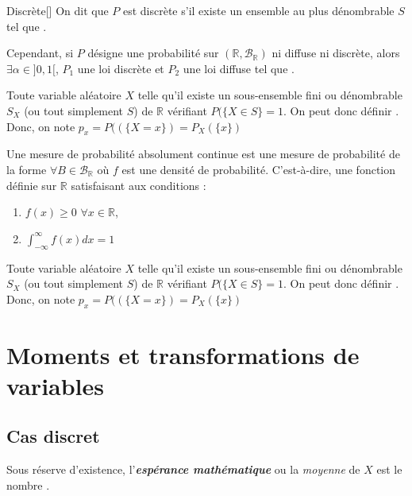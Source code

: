 \documentclass[10pt, french]{report}
\begin{document}
\begin{multicols*}{2}
\begin{definitionGENERAL}{Discrète}[]
On dit que $P$ est discrète s'il existe un ensemble au plus dénombrable $S$ tel que .
\end{definitionGENERAL}

Cependant, si $P$ désigne une probabilité sur $(\mathbb{R}, \mathcal{B}_{\mathbb{R}})$ ni diffuse ni discrète, alors $\exists \alpha \in ]0, 1[$, $P_{1}$ une loi discrète et $P_{2}$ une loi diffuse tel que .

\bigskip

\begin{definitionNOHFILL}
Toute variable aléatoire $X$ telle qu'il existe un sous-ensemble fini ou dénombrable $S_{X}$ (ou tout simplement $S$) de $\mathbb{R}$ vérifiant $P(\{X \in S\} = 1$. On peut donc définir . Donc, on note $p_{x} = P((\{X = x\}) = P_{X}(\{x\})$
\end{definitionNOHFILL}

\begin{definitionNOHFILL}
Une mesure de probabilité absolument continue est une mesure de probabilité de la forme  $\forall B \in \mathcal{B}_{\mathbb{R}}$ où $f$ est une densité de probabilité. C'est-à-dire, une fonction définie sur $\mathbb{R}$ satisfaisant aux conditions : 
\begin{enumerate}[label = \circled{\arabic*}{trueblue}]
	\item	$f(x) \geq 0$ $\forall x \in \mathbb{R}$,
	\item	$\int_{-\infty}^{\infty} f(x)dx = 1$
\end{enumerate}

Toute variable aléatoire $X$ telle qu'il existe un sous-ensemble fini ou dénombrable $S_{X}$ (ou tout simplement $S$) de $\mathbb{R}$ vérifiant $P(\{X \in S\} = 1$. On peut donc définir . Donc, on note $p_{x} = P((\{X = x\}) = P_{X}(\{x\})$
\end{definitionNOHFILL}


\newpage
\chapter{Moments et transformations de variables}
\section{Cas discret}
\begin{definitionNOHFILL}[Espérance]
Sous réserve d'existence, l'\textbf{\textit{espérance mathématique}} ou la \textit{moyenne} de $X$ est le nombre .


\end{definitionNOHFILL}
\end{multicols*}
\end{document}
